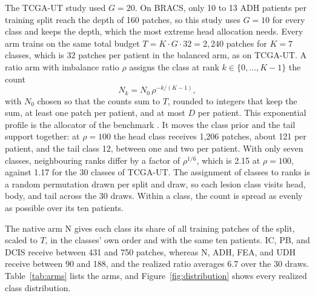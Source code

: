 \documentclass[11pt]{article}
\begin{document}
The TCGA-UT study used $G=20$. On BRACS, only 10 to 13 ADH patients per training split reach the depth of 160 patches, so this study uses $G=10$ for every class and keeps the depth, which the most extreme head allocation needs. Every arm trains on the same total budget $T=K\cdot G\cdot 32=2{,}240$ patches for $K=7$ classes, which is 32 patches per patient in the balanced arm, as on TCGA-UT. A ratio arm with imbalance ratio $\rho$ assigns the class at rank $k\in\{0,\dots,K-1\}$ the count
\begin{equation}
  N_k = N_0\,\rho^{-k/(K-1)},
  \label{eq:profile}
\end{equation}
\noindent with $N_0$ chosen so that the counts sum to $T$, rounded to integers that keep the sum, at least one patch per patient, and at most $D$ per patient. This exponential profile is the allocator of the benchmark \citep{queisler2026benchmarkProtocol}. It moves the class prior and the tail support together: at $\rho=100$ the head class receives 1,206 patches, about 121 per patient, and the tail class 12, between one and two per patient. With only seven classes, neighbouring ranks differ by a factor of $\rho^{1/6}$, which is 2.15 at $\rho=100$, against 1.17 for the 30 classes of TCGA-UT. The assignment of classes to ranks is a random permutation drawn per split and draw, so each lesion class visits head, body, and tail across the 30 draws. Within a class, the count is spread as evenly as possible over its ten patients.

The native arm N gives each class its share of all training patches of the split, scaled to $T$, in the classes' own order and with the same ten patients. IC, PB, and DCIS receive between 431 and 750 patches, whereas N, ADH, FEA, and UDH receive between 90 and 188, and the realized ratio averages 6.7 over the 30 draws. Table~\ref{tab:arms} lists the arms, and Figure~\ref{fig:distribution} shows every realized class distribution.
\end{document}
